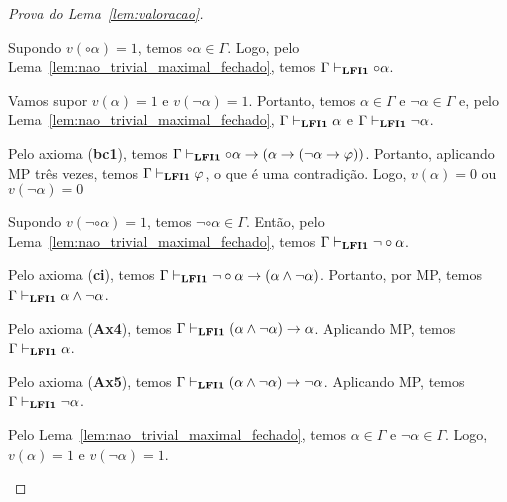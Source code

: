 \begin{proof}[Prova do Lema~\ref{lem:valoracao}]
\begin{provaporcasos}

                        \begin{adjustwidth}{1cm}{}
                            \noindent Supondo $v(\circ \alpha) = 1$, temos $\circ \alpha \in \Gamma$. Logo, pelo Lema~\ref{lem:nao_trivial_maximal_fechado}, temos $\Gamma \vdash_{{\normalfont\textbf{LFI1}}{}} \circ \alpha$.

                            \noindent Vamos supor $v(\alpha) = 1$ e $v(\neg \alpha) = 1$. Portanto, temos $\alpha \in \Gamma$ e $\neg \alpha \in \Gamma$ e, pelo Lema~\ref{lem:nao_trivial_maximal_fechado}, $\Gamma \vdash_{{\normalfont\textbf{LFI1}}{}} \alpha$ e $\Gamma \vdash_{{\normalfont\textbf{LFI1}}{}} \neg \alpha$.

                            \noindent Pelo axioma (\textbf{bc1}), temos $\Gamma \vdash_{{\normalfont\textbf{LFI1}}{}} \circ \alpha \to (\alpha \to (\neg \alpha \to \varphi))$. Portanto, aplicando MP três vezes, temos $\Gamma \vdash_{{\normalfont\textbf{LFI1}}{}} \varphi$, o que é uma contradição. Logo, $v(\alpha) = 0$ ou $v(\neg \alpha) = 0$
                        


                        \end{adjustwidth}
                    

                        \begin{adjustwidth}{1cm}{}
                            
                            \noindent Supondo $v(\neg \circ \alpha) = 1$, temos $\neg \circ \alpha \in \Gamma$. Então, pelo Lema~\ref{lem:nao_trivial_maximal_fechado}, temos $\Gamma \vdash_{{\normalfont\textbf{LFI1}}{}} \neg \circ \alpha$.

                            Pelo axioma (\textbf{ci}), temos $\Gamma \vdash_{{\normalfont\textbf{LFI1}}{}} \neg \circ \alpha \to (\alpha \land \neg \alpha)$. Portanto, por MP, temos $\Gamma \vdash_{{\normalfont\textbf{LFI1}}{}} \alpha \land \neg \alpha$. 
                            
                            Pelo axioma (\textbf{Ax4}), temos $\Gamma \vdash_{{\normalfont\textbf{LFI1}}{}} (\alpha \land \neg \alpha) \to \alpha$. Aplicando MP, temos $\Gamma \vdash_{{\normalfont\textbf{LFI1}}{}} \alpha$.
                            
                            Pelo axioma (\textbf{Ax5}), temos $\Gamma \vdash_{{\normalfont\textbf{LFI1}}{}} (\alpha \land \neg \alpha) \to \neg \alpha$. Aplicando MP, temos $\Gamma \vdash_{{\normalfont\textbf{LFI1}}{}} \neg \alpha$.

                            Pelo Lema~\ref{lem:nao_trivial_maximal_fechado}, temos $\alpha \in \Gamma$ e $\neg \alpha \in \Gamma$. Logo, $v(\alpha) = 1$ e $v(\neg \alpha) = 1$.


\end{adjustwidth}
\end{provaporcasos}
\end{proof}
